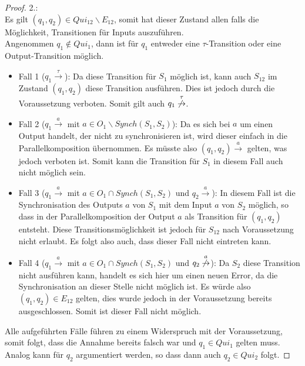 \begin{proof}
  2.:\\
  Es gilt $(q_1,q_2)\in Qui_{12}\backslash E_{12}$, somit hat
  dieser Zustand allen falls die Möglichkeit, Transitionen für Inputs
  auszuführen.\\
  Angenommen $q_1\notin Qui_1$, dann ist für $q_1$ entweder eine
  $\tau$-Transition oder eine Output-Transition möglich.
  \begin{itemize}
    \item Fall 1 ($q_1 \overset{\tau}{\rightarrow}$): Da diese Transition für
      $S_1$ möglich ist, kann auch $S_{12}$ im Zustand $(q_1,q_2)$ diese
      Transition ausführen. Dies ist jedoch durch die Voraussetzung verboten.
      Somit gilt auch $q_1 \overset{\tau}{\not{\hspace{-0.1cm}\rightarrow}}$.
    \item Fall 2 ($q_1 \overset{a}{\rightarrow}$ mit $a\in O_1\backslash
      Synch(S_1,S_2)$): Da es sich bei $a$ um einen Output handelt, der nicht
      zu synchronisieren ist, wird dieser einfach in die Parallelkomposition
      übernommen. Es müsste also $(q_1,q_2) \overset{a}{\rightarrow}$ gelten,
      was jedoch verboten ist. Somit kann die Transition für $S_1$ in diesem
      Fall auch nicht möglich sein.
    \item Fall 3 ($q_1 \overset{a}{\rightarrow}$ mit $a\in O_1\cap
      Synch(S_1,S_2)$ und $q_2 \overset{a}{\rightarrow}$): In diesem Fall ist
      die Synchronisation des Outputs $a$ von $S_1$ mit dem Input $a$ von $S_2$
      möglich, so dass in der Parallelkomposition der Output $a$ als Transition
      für $(q_1,q_2)$ entsteht. Diese Transitionsmöglichkeit ist jedoch für
      $S_{12}$ nach Voraussetzung nicht erlaubt. Es folgt also auch, dass
      dieser Fall nicht eintreten kann.
    \item Fall 4 \Big($q_1 \overset{a}{\rightarrow}$ mit $a\in O_1\cap
      Synch(S_1,S_2)$ und $q_2
      \overset{a}{\not{\hspace{-0.1cm}\rightarrow}}$\Big):
      Da $S_2$ diese Transition nicht ausführen kann, handelt es sich hier um
      einen neuen Error, da die Synchronisation an dieser Stelle nicht möglich
      ist. Es würde also $(q_1,q_2)\in E_{12}$ gelten, dies wurde jedoch in der
      Voraussetzung bereits ausgeschlossen. Somit ist dieser Fall nicht
      möglich.
  \end{itemize}
  Alle aufgeführten Fälle führen zu einem Widerspruch mit der Voraussetzung,
  somit folgt, dass die Annahme bereits falsch war und $q_1\in Qui_1$ gelten
  muss. Analog kann für $q_2$ argumentiert werden, so dass dann auch $q_2\in
  Qui_2$ folgt.
\end{proof}

